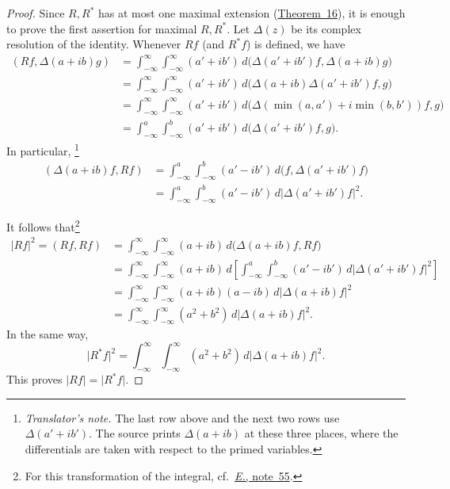 \documentclass[
  paper=b5,
  twoside=true,
  fontsize=13pt,
  headings=normal,
  bookmarkpackage=false
]{scrartcl}
\theoremstyle{definition}
\newcommand{\TheoremRef}[1]{\hyperref[thm:#1]{Theorem~#1}}
\newcommand{\ErefText}[1]{\href{https://doi.org/10.1007/BF01782338}{#1}}
\newcounter{translatornote}
\newcounter{savedfootnote}
\newcommand{\TranslatorNote}[1]{%
  \stepcounter{translatornote}%
  \setcounter{savedfootnote}{\value{footnote}}%
  \begingroup
    \renewcommand{\thefootnote}{T\arabic{translatornote}}%
    \footnote{\textit{Translator's note.} #1}%
  \endgroup
  \setcounter{footnote}{\value{savedfootnote}}}
\begin{document}
\begin{proof}
Since \(R,R^{*}\) has at most one maximal extension (\TheoremRef{16}), it is
enough to prove the first assertion for maximal \(R,R^{*}\).  Let
\(\Delta(z)\) be its complex resolution of the identity.
Whenever \(Rf\) (and \(R^{*}f\)) is defined, we have
\begin{align*}
  (Rf,\Delta(a+ib)g)
  &=
  \int_{-\infty}^{\infty}\!\!\int_{-\infty}^{\infty}
  (a'+ib')\,
  d\bigl(\Delta(a'+ib')f,\Delta(a+ib)g\bigr)\\
  &=
  \int_{-\infty}^{\infty}\!\!\int_{-\infty}^{\infty}
  (a'+ib')\,
  d\bigl(\Delta(a+ib)\Delta(a'+ib')f,g\bigr)\\
  &=
  \int_{-\infty}^{\infty}\!\!\int_{-\infty}^{\infty}
  (a'+ib')\,
  d\bigl(\Delta(\min(a,a')+i\min(b,b'))f,g\bigr)\\
  &=
  \int_{-\infty}^{a}\!\!\int_{-\infty}^{b}
  (a'+ib')\,d\bigl(\Delta(a'+ib')f,g\bigr).
\end{align*}
In particular,\TranslatorNote{The last row above and the next two rows
use \(\Delta(a'+ib')\). The source prints \(\Delta(a+ib)\) at these three
places, where the differentials are taken with respect to the primed
variables.}
\begin{align*}
  (\Delta(a+ib)f,Rf)
  &=
  \int_{-\infty}^{a}\!\!\int_{-\infty}^{b}
  (a'-ib')\,d\bigl(f,\Delta(a'+ib')f\bigr)\\
  &=
  \int_{-\infty}^{a}\!\!\int_{-\infty}^{b}
  (a'-ib')\,d\lvert\Delta(a'+ib')f\rvert^{2}.
\end{align*}

It follows that\footnote{\label{fn:69}For this transformation of the integral,
cf.\ \ErefText{\emph{E.}, note~55}.}
\begin{align*}
  \lvert Rf\rvert^{2}=(Rf,Rf)
  &=
  \int_{-\infty}^{\infty}\!\!\int_{-\infty}^{\infty}
  (a+ib)\,d\bigl(\Delta(a+ib)f,Rf\bigr)\\
  &=
  \int_{-\infty}^{\infty}\!\!\int_{-\infty}^{\infty}
  (a+ib)\,
  d\left[
    \int_{-\infty}^{a}\!\!\int_{-\infty}^{b}
    (a'-ib')\,d\lvert\Delta(a'+ib')f\rvert^{2}
  \right]\\
  &=
  \int_{-\infty}^{\infty}\!\!\int_{-\infty}^{\infty}
  (a+ib)(a-ib)\,d\lvert\Delta(a+ib)f\rvert^{2}\\
  &=
  \int_{-\infty}^{\infty}\!\!\int_{-\infty}^{\infty}
  (a^{2}+b^{2})\,d\lvert\Delta(a+ib)f\rvert^{2}.
\end{align*}
In the same way,
\[
  \lvert R^{*}f\rvert^{2}
  =
  \int_{-\infty}^{\infty}\!\!\int_{-\infty}^{\infty}
  (a^{2}+b^{2})\,d\lvert\Delta(a+ib)f\rvert^{2}.
\]
This proves \(\lvert Rf\rvert=\lvert R^{*}f\rvert\).


\end{proof}
\end{document}
